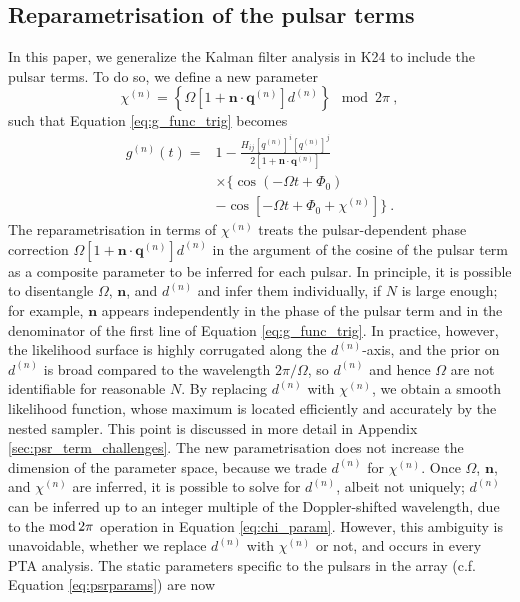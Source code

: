 \documentclass[fleqn,usenatbib,useAMS]{mnras}
\begin{document}
\subsection{Reparametrisation of the pulsar terms} \label{sec:pulsar_term2}
In this paper, we generalize the Kalman filter analysis in K24 to include the pulsar terms. To do so, we define a new parameter 
\begin{equation}
	\chi^{(n)} = \left\{ \Omega \left[ 1 + \boldsymbol{n}\cdot \boldsymbol{q}^{(n)} \right]  d^{(n)} \right \} \mod 2 \pi \ , \label{eq:chi_param}
\end{equation}
such that Equation \eqref{eq:g_func_trig} becomes
\begin{align}
	g^{(n)}(t) =& 1 - \frac{ H_{ij}[q^{(n)}]^i [q^{(n)}]^j }{2 [1 + \boldsymbol{n}\cdot \boldsymbol{q}^{(n)}] } \nonumber \\
	& \times \Big \{\cos\left(-\Omega t +\Phi_0\right) \nonumber \\
	&- \cos \left [-\Omega t +\Phi_0 + \chi^{(n)} \right ] \Big \} \ .
	\label{eq:g_func_trig_chi}
\end{align}
The reparametrisation in terms of $\chi^{(n)}$ treats the pulsar-dependent phase correction $\Omega \left[ 1 + \boldsymbol{n}\cdot \boldsymbol{q}^{(n)} \right]  d^{(n)}$ in the argument of the cosine of the pulsar term as a composite parameter to be inferred for each pulsar. In principle, it is possible to disentangle $\Omega$, $\boldsymbol{n}$, and $d^{(n)}$ and infer them individually, if $N$ is large enough; for example, $\boldsymbol{n}$ appears independently in the phase of the pulsar term and in the denominator of the first line of Equation \eqref{eq:g_func_trig}. In practice, however, the likelihood surface is highly corrugated along the $d^{(n)}$-axis, and the prior on $d^{(n)}$ is broad compared to the wavelength $2\pi/\Omega$, so $d^{(n)}$ and hence $\Omega$ are not identifiable for reasonable $N$. By replacing $d^{(n)}$ with $\chi^{(n)}$, we obtain a smooth likelihood function, whose maximum is located efficiently and accurately by the nested sampler. This point is discussed in more detail in Appendix \ref{sec:psr_term_challenges}. The new parametrisation does not increase the dimension of the parameter space, because we trade $d^{(n)}$ for $\chi^{(n)}$. Once $\Omega$, ${\boldsymbol{n}}$, and $\chi^{(n)}$ are inferred, it is possible to solve for $d^{(n)}$, albeit not uniquely; $d^{(n)}$ can be inferred up to an integer multiple of the Doppler-shifted wavelength, due to the ${\rm mod} \, 2 \pi$ operation in Equation \eqref{eq:chi_param}. However, this ambiguity is unavoidable, whether we replace $d^{(n)}$ with $\chi^{(n)}$ or not, and occurs in every PTA analysis. The static parameters specific to the pulsars in the array (c.f. Equation \eqref{eq:psrparams}) are now
\end{document}
